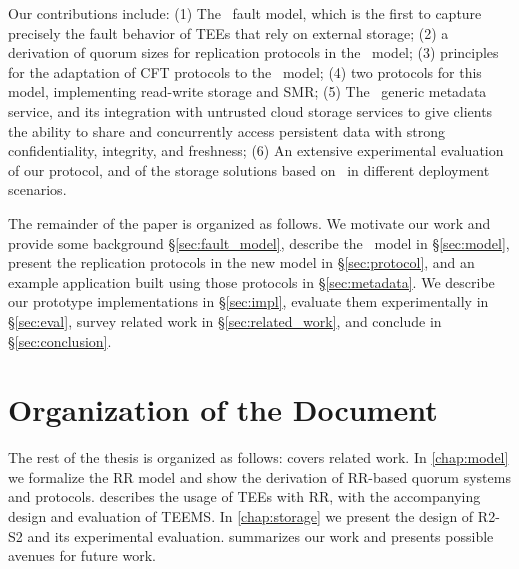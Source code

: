 Our contributions include:
 (1) The \faultmodel\ fault model, which is the first to capture
precisely the fault behavior of \acp{TEE} that rely on external storage;
(2) a derivation of quorum sizes for replication protocols in the
\faultmodel\ model;
(3) principles for the adaptation of CFT protocols to
the \faultmodel\ model;
(4) two protocols for this model, implementing read-write storage and
SMR;
(5) The \sys\ generic metadata service, and its integration with
untrusted cloud storage services to give clients the ability to share
and concurrently access persistent data with strong confidentiality,
integrity, and freshness;
(6) An extensive experimental evaluation of our protocol, and of the
storage solutions based on \sys\ in different deployment scenarios.


The remainder of the paper is organized as follows.  We motivate
our work and provide some background \S\ref{sec:fault_model},
describe the \faultmodel\ model in \S\ref{sec:model}, present the
replication protocols in the new model in
\S\ref{sec:protocol}, and an example application built using
those protocols in \S\ref{sec:metadata}.  We describe our
prototype implementations in \S\ref{sec:impl}, evaluate them
experimentally in \S\ref{sec:eval}, survey related work in
\S\ref{sec:related_work}, and conclude in \S\ref{sec:conclusion}.





\fi

\section{Organization of the Document}

The rest of the thesis is organized as follows:
 covers related work. In \cref{chap:model} we
formalize the \ac{RR} model and show the derivation of
\ac{RR}-based quorum systems and protocols. 
describes the usage of \acp{TEE} with \ac{RR}, with the
accompanying design and evaluation of \ac{TEEMS}. In
\cref{chap:storage} we present the design of
\ac{R2-S2} and its experimental evaluation.
 summarizes our work and presents possible
avenues for future work.

